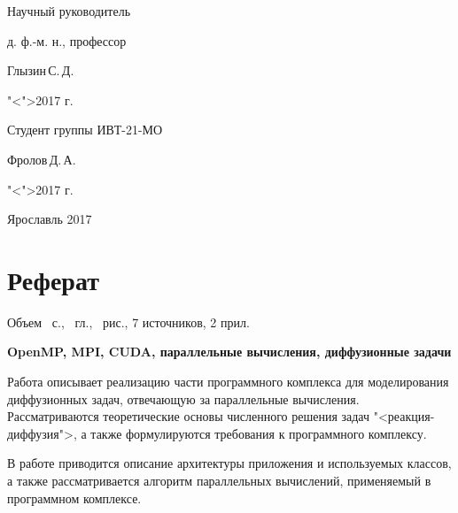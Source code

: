 \documentclass[a4paper, 14pt]{extarticle}
\theoremstyle{definition}
\begin{document}
{\begin{flushright}
	Научный руководитель\par
	д. ф.-м. н., профессор\par
	\underline{\hspace{3.5cm}}Глызин\,С.\,Д.\par
	"<\underline{\hspace{0.8cm}}">\underline{\hspace{3.5cm}}2017 г.\par
\end{flushright}

\bigskip 

\begin{flushright}
	Студент группы ИВТ-21-МО\par
	\underline{\hspace{2.5cm}}Фролов\,Д.\,А.\par
	"<\underline{\hspace{0.8cm}}">\underline{\hspace{3.5cm}}2017 г.\par
\end{flushright}

\vspace{\fill}

\begin{center}
	Ярославль 2017
\end{center}

\clearpage
}



\section*{Реферат}
\noindent Объем \pageref*{LastPage}~с., 
\totsections~гл., \totfig~рис., 
7 источников, 2 прил. 

\noindent\textbf{OpenMP, MPI, CUDA, параллельные вычисления, диффузионные задачи}


\par Работа описывает реализацию части программного комплекса для моделирования диффузионных задач, отвечающую за параллельные вычисления. Рассматриваются теоретические основы численного решения задач "<реакция-диффузия">, а также формулируются требования к программного комплексу.

\par В работе приводится описание архитектуры приложения и используемых классов, а также рассматривается алгоритм параллельных вычислений, применяемый в программном комплексе.
\end{document}
